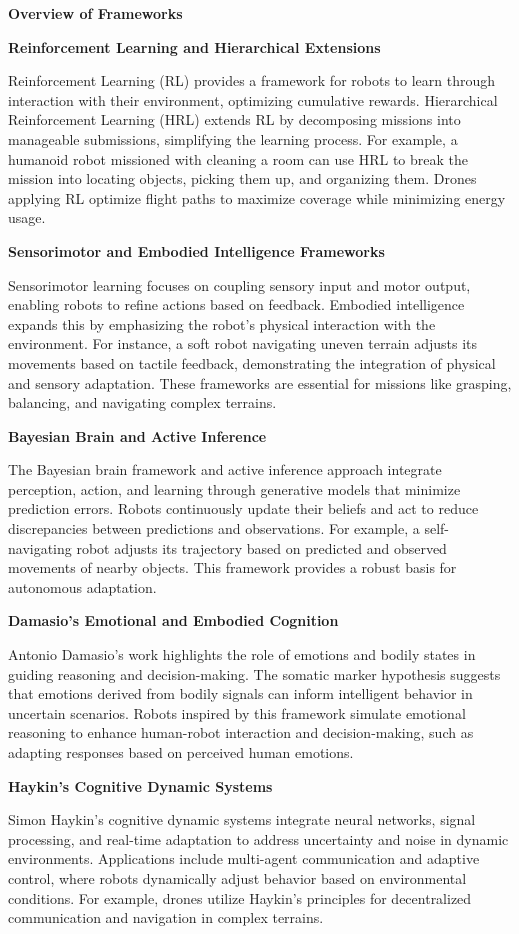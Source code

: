 \documentclass{book}
\providecommand{\ProjectDeepHeading}[2]{%
    \par\medskip\noindent\textbf{#2}\par\smallskip
}
\begin{document}
\ProjectDeepHeading{4}{Overview of Frameworks}
    \ProjectDeepHeading{5}{Reinforcement Learning and Hierarchical Extensions}
    Reinforcement Learning (RL) provides a framework for robots to learn through interaction with their environment, optimizing cumulative rewards. Hierarchical Reinforcement Learning (HRL) extends RL by decomposing missions into manageable submissions, simplifying the learning process. For example, a humanoid robot missioned with cleaning a room can use HRL to break the mission into locating objects, picking them up, and organizing them. Drones applying RL optimize flight paths to maximize coverage while minimizing energy usage.

    \ProjectDeepHeading{5}{Sensorimotor and Embodied Intelligence Frameworks}
    Sensorimotor learning focuses on coupling sensory input and motor output, enabling robots to refine actions based on feedback. Embodied intelligence expands this by emphasizing the robot's physical interaction with the environment. For instance, a soft robot navigating uneven terrain adjusts its movements based on tactile feedback, demonstrating the integration of physical and sensory adaptation. These frameworks are essential for missions like grasping, balancing, and navigating complex terrains.


    \ProjectDeepHeading{5}{Bayesian Brain and Active Inference}
    The Bayesian brain framework and active inference approach integrate perception, action, and learning through generative models that minimize prediction errors. Robots continuously update their beliefs and act to reduce discrepancies between predictions and observations. For example, a self-navigating robot adjusts its trajectory based on predicted and observed movements of nearby objects. This framework provides a robust basis for autonomous adaptation. 

    \ProjectDeepHeading{5}{Damasio’s Emotional and Embodied Cognition}
    Antonio Damasio's work highlights the role of emotions and bodily states in guiding reasoning and decision-making. The somatic marker hypothesis suggests that emotions derived from bodily signals can inform intelligent behavior in uncertain scenarios. Robots inspired by this framework simulate emotional reasoning to enhance human-robot interaction and decision-making, such as adapting responses based on perceived human emotions. 

    \ProjectDeepHeading{5}{Haykin’s Cognitive Dynamic Systems}
    Simon Haykin’s cognitive dynamic systems integrate neural networks, signal processing, and real-time adaptation to address uncertainty and noise in dynamic environments. Applications include multi-agent communication and adaptive control, where robots dynamically adjust behavior based on environmental conditions. For example, drones utilize Haykin’s principles for decentralized communication and navigation in complex terrains. 
\end{document}
